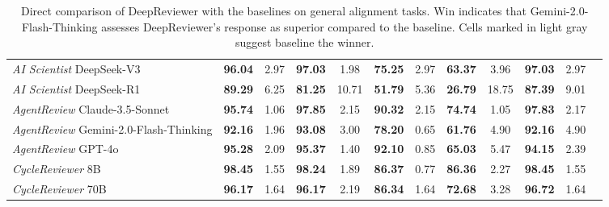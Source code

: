 \documentclass{article}
\begin{document}
\begin{table}[h]
{\begin{tabular}{lcccccccc|ccc}
\textit{AI Scientist} DeepSeek-V3 & \cellcolor[HTML]{F9EBE3}\textbf{96.04} & 2.97 & \cellcolor[HTML]{F9EBE3}\textbf{97.03} & 1.98 & \cellcolor[HTML]{F9EBE3}\textbf{75.25} & 2.97 & \cellcolor[HTML]{F9EBE3}\textbf{63.37} & 3.96 & \cellcolor[HTML]{F9EBE3}\textbf{97.03} & 2.97 \\
\textit{AI Scientist} DeepSeek-R1 & \cellcolor[HTML]{F9EBE3}\textbf{89.29} & 6.25 & \cellcolor[HTML]{F9EBE3}\textbf{81.25} & 10.71 & \cellcolor[HTML]{F9EBE3}\textbf{51.79} & 5.36 & \cellcolor[HTML]{F9EBE3}\textbf{26.79} & 18.75 & \cellcolor[HTML]{F9EBE3}\textbf{87.39} & 9.01 \\


\textit{AgentReview} Claude-3.5-Sonnet & \cellcolor[HTML]{F9EBE3}\textbf{95.74} & 1.06 & \cellcolor[HTML]{F9EBE3}\textbf{97.85} & 2.15 & \cellcolor[HTML]{F9EBE3}\textbf{90.32} & 2.15 & \cellcolor[HTML]{F9EBE3}\textbf{74.74} & 1.05 & \cellcolor[HTML]{F9EBE3}\textbf{97.83} & 2.17 \\
\textit{AgentReview} Gemini-2.0-Flash-Thinking & \cellcolor[HTML]{F9EBE3}\textbf{92.16} & 1.96 & \cellcolor[HTML]{F9EBE3}\textbf{93.08} & 3.00 & \cellcolor[HTML]{F9EBE3}\textbf{78.20} & 0.65 & \cellcolor[HTML]{F9EBE3}\textbf{61.76} & 4.90 & \cellcolor[HTML]{F9EBE3}\textbf{92.16} & 4.90 \\
\textit{AgentReview} GPT-4o & \cellcolor[HTML]{F9EBE3}\textbf{95.28} & 2.09 & \cellcolor[HTML]{F9EBE3}\textbf{95.37} & 1.40 & \cellcolor[HTML]{F9EBE3}\textbf{92.10} & 0.85 & \cellcolor[HTML]{F9EBE3}\textbf{65.03} & 5.47 & \cellcolor[HTML]{F9EBE3}\textbf{94.15} & 2.39 \\

\textit{CycleReviewer} 8B & \cellcolor[HTML]{F9EBE3}\textbf{98.45} & 1.55 & \cellcolor[HTML]{F9EBE3}\textbf{98.24} & 1.89 & \cellcolor[HTML]{F9EBE3}\textbf{86.37} & 0.77 & \cellcolor[HTML]{F9EBE3}\textbf{86.36} & 2.27 & \cellcolor[HTML]{F9EBE3}\textbf{98.45} & 1.55 \\
\textit{CycleReviewer} 70B & \cellcolor[HTML]{F9EBE3}\textbf{96.17} & 1.64 & \cellcolor[HTML]{F9EBE3}\textbf{96.17} & 2.19 & \cellcolor[HTML]{F9EBE3}\textbf{86.34} & 1.64 & \cellcolor[HTML]{F9EBE3}\textbf{72.68} & 3.28 & \cellcolor[HTML]{F9EBE3}\textbf{96.72} & 1.64 \\
\bottomrule
\end{tabular}}
\caption{Direct comparison of DeepReviewer with the baselines on general alignment tasks. Win indicates that Gemini-2.0-Flash-Thinking assesses DeepReviewer's response as superior compared to the baseline. Cells marked in light gray suggest baseline the winner.}

\label{tab:win_rate_comparison_deepreviewer}
\end{table}
\end{document}
